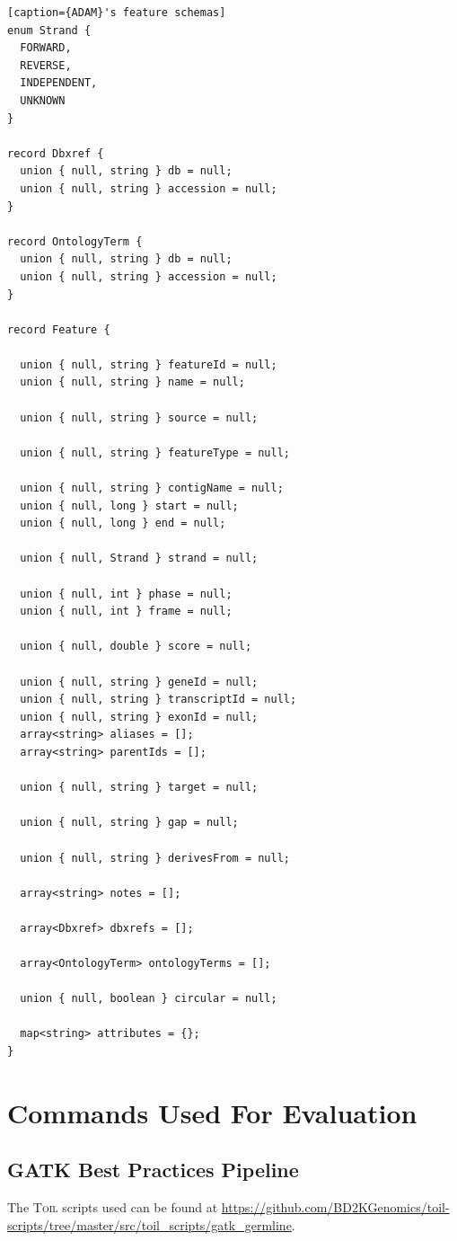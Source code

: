 \documentclass[phd]{ucbthesis}
\begin{document}
\begin{lstlisting}[caption={ADAM}'s feature schemas]
enum Strand {
  FORWARD,
  REVERSE,
  INDEPENDENT,
  UNKNOWN
}

record Dbxref {
  union { null, string } db = null;
  union { null, string } accession = null;
}

record OntologyTerm {
  union { null, string } db = null;
  union { null, string } accession = null;
}

record Feature {

  union { null, string } featureId = null;
  union { null, string } name = null;

  union { null, string } source = null;

  union { null, string } featureType = null;

  union { null, string } contigName = null;
  union { null, long } start = null;
  union { null, long } end = null;

  union { null, Strand } strand = null;

  union { null, int } phase = null;
  union { null, int } frame = null;

  union { null, double } score = null;

  union { null, string } geneId = null;
  union { null, string } transcriptId = null;
  union { null, string } exonId = null;
  array<string> aliases = [];
  array<string> parentIds = [];

  union { null, string } target = null;

  union { null, string } gap = null;

  union { null, string } derivesFrom = null;

  array<string> notes = [];

  array<Dbxref> dbxrefs = [];

  array<OntologyTerm> ontologyTerms = [];

  union { null, boolean } circular = null;

  map<string> attributes = {};
}
\end{lstlisting}

\chapter{Commands Used For Evaluation}
\label{sec:cmds}

\section{GATK Best Practices Pipeline}
\label{sec:gatk-best-practices}

The \textsc{Toil} scripts used can be found at
\url{https://github.com/BD2KGenomics/toil-scripts/tree/master/src/toil_scripts/gatk_germline}.
\end{document}

